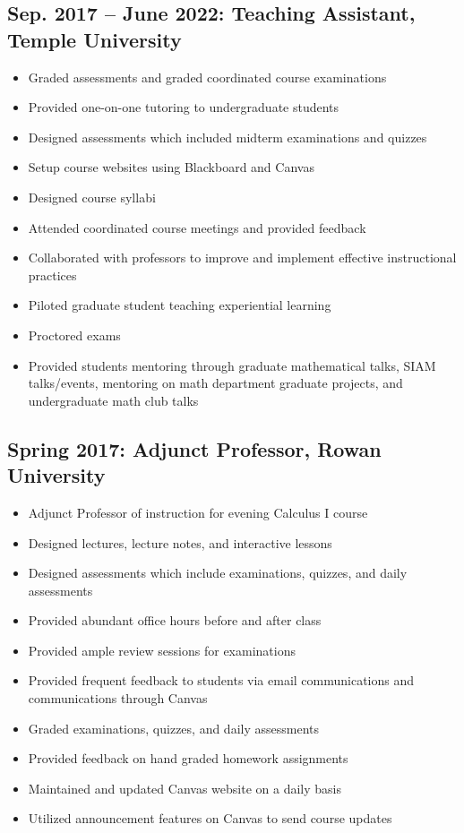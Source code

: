\documentclass[11pt]{article}
\begin{document}
\subsection*{Sep. 2017 -- June 2022: Teaching Assistant, Temple University}
\begin{itemize}[leftmargin=*]
    \item Graded assessments and graded coordinated course examinations
    \item Provided one-on-one tutoring to undergraduate students
    \item Designed assessments which included midterm examinations and quizzes
    \item Setup course websites using Blackboard and Canvas
    \item Designed course syllabi
    \item Attended coordinated course meetings and provided feedback
    \item Collaborated with professors to improve and implement effective instructional practices
    \item Piloted graduate student teaching experiential learning
    \item Proctored exams
    \item Provided students mentoring through graduate mathematical talks, SIAM talks/events, mentoring on math department graduate projects, and undergraduate math club talks
\end{itemize}

\subsection*{Spring 2017: Adjunct Professor, Rowan University}
\begin{itemize}[leftmargin=*]
    \item Adjunct Professor of instruction for evening Calculus I course
    \item Designed lectures, lecture notes, and interactive lessons
    \item Designed assessments which include examinations, quizzes, and daily assessments
    \item Provided abundant office hours before and after class
    \item Provided ample review sessions for examinations
    \item Provided frequent feedback to students via email communications and communications through Canvas
    \item Graded examinations, quizzes, and daily assessments
    \item Provided feedback on hand graded homework assignments
    \item Maintained and updated Canvas website on a daily basis
    \item Utilized announcement features on Canvas to send course updates
\end{itemize}
\end{document}
